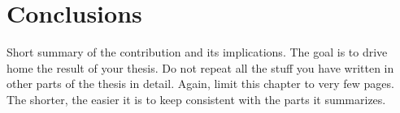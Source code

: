 \documentclass[12pt]{article}
\begin{document}

\pagebreak




\section{Conclusions}
\label{sec:6}
Short summary of the contribution and its implications. The goal is to drive home the result of your thesis.
Do not repeat all the stuff you have written in other parts of the thesis in detail. Again, limit this chapter to very few pages. 
The shorter, the easier it is to keep consistent with the parts it summarizes.

\pagebreak






\end{document}
